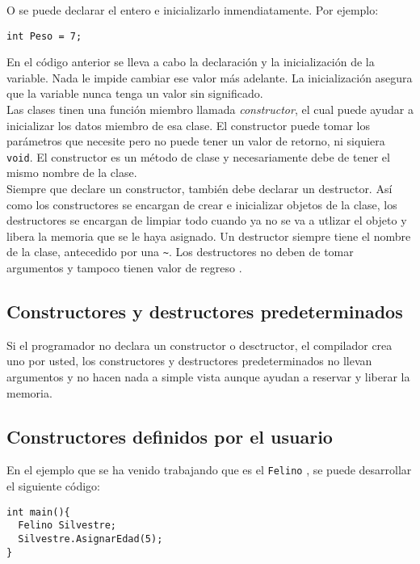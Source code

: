 \documentclass[12pt]{extarticle}
\newcommand{\<}{\langle}
\renewcommand{\>}{\rangle}
\theoremstyle{definition}
\begin{document}
O se puede declarar el entero e inicializarlo inmendiatamente. Por ejemplo:\\

\begin{lstlisting}[caption={Declaración e inicialización de una variable},captionpos=b]
int Peso = 7;
\end{lstlisting}

En el código anterior se lleva a cabo  la declaración y la inicialización de la variable. Nada le impide cambiar ese valor más adelante. La inicialización asegura que la variable nunca tenga un valor sin significado.\\

Las clases tinen una función miembro llamada \textit{constructor}, el cual puede ayudar a inicializar los datos miembro de esa clase. El constructor puede tomar los parámetros que necesite pero no puede tener un valor de retorno, ni siquiera \verb|void|. El constructor es un método de clase y necesariamente debe de tener el mismo nombre de la clase.\\ 

Siempre que declare un constructor, también debe declarar un destructor. Así como los constructores se encargan de crear e inicializar objetos de la clase, los destructores se encargan de limpiar todo cuando ya no se va a utlizar el objeto y libera la memoria que se le haya asignado. Un destructor siempre tiene el nombre de la clase, antecedido por una \verb|~|. Los destructores no deben de tomar argumentos y tampoco tienen valor de regreso .\\

\subsection{Constructores y destructores predeterminados}
Si el programador no declara un constructor o desctructor, el compilador crea uno por usted, los constructores y destructores predeterminados no llevan argumentos y no hacen nada a simple vista aunque ayudan a reservar y liberar la memoria.\\

\subsection{Constructores definidos por el usuario}
En el ejemplo que se ha venido trabajando que es el \verb|Felino| , se puede desarrollar el siguiente código:

\begin{lstlisting}[caption={Declaración e inicialización de un objeto},captionpos=b]
int main(){
  Felino Silvestre; 
  Silvestre.AsignarEdad(5);
}
\end{lstlisting}
\end{document}
